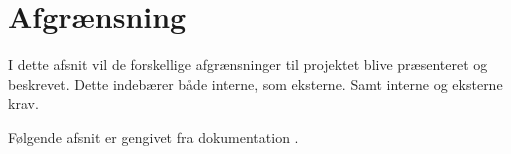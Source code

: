 \section{Afgrænsning}

I dette afsnit vil de forskellige afgrænsninger til projektet blive præsenteret og beskrevet. Dette indebærer både interne, som eksterne. Samt interne og eksterne krav.

Følgende afsnit er gengivet fra dokumentation .